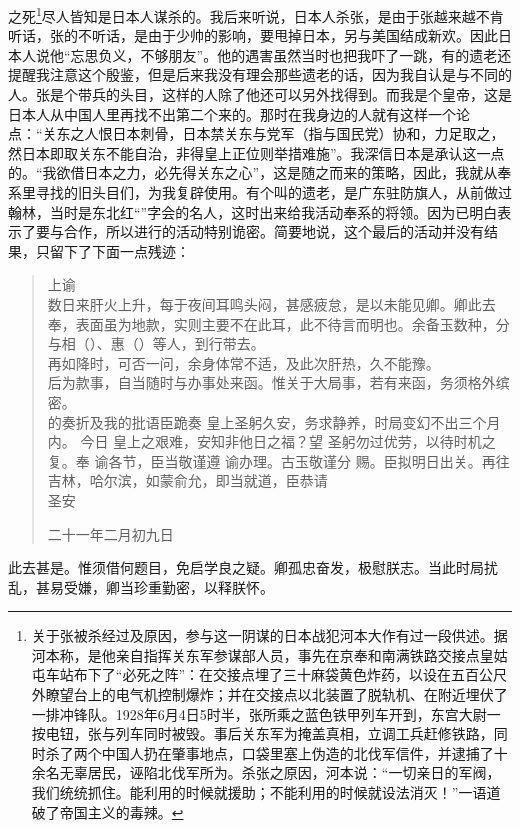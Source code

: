 之死\footnote{关于张被杀经过及原因，参与这一阴谋的日本战犯河本大作有过一段供述。据河本称，是他亲自指挥关东军参谋部人员，事先在京奉和南满铁路交接点皇姑屯车站布下了“必死之阵”：在交接点埋了三十麻袋黄色炸药，以设在五百公尺外瞭望台上的电气机控制爆炸；并在交接点以北装置了脱轨机、在附近埋伏了一排冲锋队。1928年6月4日5时半，张所乘之蓝色铁甲列车开到，东宫大尉一按电钮，张与列车同时被毁。事后关东军为掩盖真相，立调工兵赶修铁路，同时杀了两个中国人扔在肇事地点，口袋里塞上伪造的北伐军信件，并逮捕了十余名无辜居民，诬陷北伐军所为。杀张之原因，河本说：“一切亲日的军阀，我们统统抓住。能利用的时候就援助；不能利用的时候就设法消灭！”一语道破了帝国主义的毒辣。}尽人皆知是日本人谋杀的。我后来听说，日本人杀张，是由于张越来越不肯听话，张的不听话，是由于少帅的影响，要甩掉日本，另与美国结成新欢。因此日本人说他“忘思负义，不够朋友”。他的遇害虽然当时也把我吓了一跳，有的遗老还提醒我注意这个殷鉴，但是后来我没有理会那些遗老的话，因为我自认是与不同的人。张是个带兵的头目，这样的人除了他还可以另外找得到。而我是个皇帝，这是日本人从中国人里再找不出第二个来的。那时在我身边的人就有这样一个论点：“关东之人恨日本刺骨，日本禁关东与党军（指与国民党）协和，力足取之，然日本即取关东不能自治，非得皇上正位则举措难施”。我深信日本是承认这一点的。“我欲借日本之力，必先得关东之心”，这是随之而来的策略，因此，我就从奉系里寻找的旧头目们，为我复辟使用。有个叫的遗老，是广东驻防旗人，从前做过翰林，当时是东北红“”字会的名人，这时出来给我活动奉系的将领。因为已明白表示了要与合作，所以进行的活动特别诡密。简要地说，这个最后的活动并没有结果，只留下了下面一点残迹：\\

\begin{quote}
	上谕\\

数日来肝火上升，每于夜间耳鸣头闷，甚感疲怠，是以未能见卿。卿此去奉，表面虽为地款，实则主要不在此耳，此不待言而明也。余备玉数种，分与相（）、惠（）等人，到行带去。\\

再如降时，可否一问，余身体常不适，及此次肝热，久不能豫。\\

后为款事，自当随时与办事处来函。惟关于大局事，若有来函，务须格外缤密。\\

的奏折及我的批语臣跪奏  皇上圣躬久安，务求静养，时局变幻不出三个月内。  今日  皇上之艰难，安知非他日之福？望  圣躬勿过优劳，以待时机之复。奉  谕各节，臣当敬谨遵  谕办理。古玉敬谨分  赐。臣拟明日出关。再往吉林，哈尔滨，如蒙俞允，即当就道，臣恭请\\

圣安\\

\begin{flushright}
	二十一年二月初九日\\
\end{flushright}
\end{quote}

此去甚是。惟须借何题目，免启学良之疑。卿孤忠奋发，极慰朕志。当此时局扰乱，甚易受嫌，卿当珍重勤密，以释朕怀。
